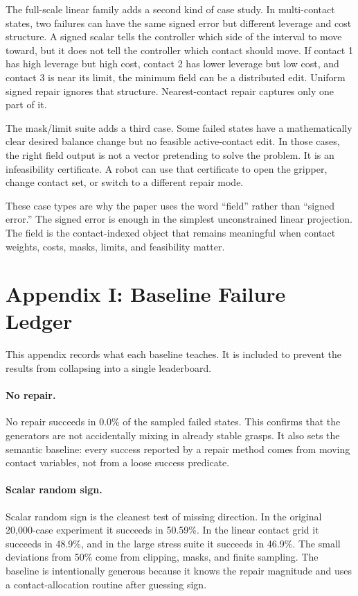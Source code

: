 \documentclass{article}
\begin{document}
The full-scale linear family adds a second kind of case study. In multi-contact states, two failures can have the same signed error but different leverage and cost structure. A signed scalar tells the controller which side of the interval to move toward, but it does not tell the controller which contact should move. If contact 1 has high leverage but high cost, contact 2 has lower leverage but low cost, and contact 3 is near its limit, the minimum field can be a distributed edit. Uniform signed repair ignores that structure. Nearest-contact repair captures only one part of it.

The mask/limit suite adds a third case. Some failed states have a mathematically clear desired balance change but no feasible active-contact edit. In those cases, the right field output is not a vector pretending to solve the problem. It is an infeasibility certificate. A robot can use that certificate to open the gripper, change contact set, or switch to a different repair mode.

These case types are why the paper uses the word ``field'' rather than ``signed error.'' The signed error is enough in the simplest unconstrained linear projection. The field is the contact-indexed object that remains meaningful when contact weights, costs, masks, limits, and feasibility matter.

\clearpage
\section{Appendix I: Baseline Failure Ledger}

This appendix records what each baseline teaches. It is included to prevent the results from collapsing into a single leaderboard.

\paragraph{No repair.}
No repair succeeds in 0.0\% of the sampled failed states. This confirms that the generators are not accidentally mixing in already stable grasps. It also sets the semantic baseline: every success reported by a repair method comes from moving contact variables, not from a loose success predicate.

\paragraph{Scalar random sign.}
Scalar random sign is the cleanest test of missing direction. In the original 20,000-case experiment it succeeds in 50.59\%. In the linear contact grid it succeeds in 48.9\%, and in the large stress suite it succeeds in 46.9\%. The small deviations from 50\% come from clipping, masks, and finite sampling. The baseline is intentionally generous because it knows the repair magnitude and uses a contact-allocation routine after guessing sign.
\end{document}

